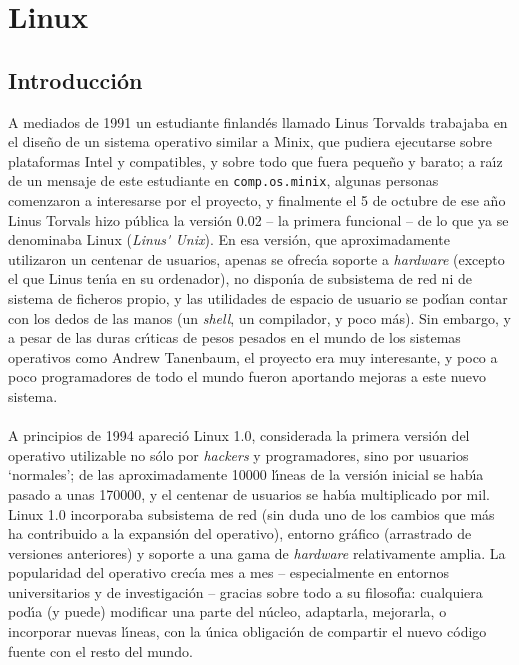 \chapter{Linux}
\section{Introducci\'on}
A mediados de 1991 un estudiante finland\'es llamado Linus Torvalds trabajaba
en el dise\~no de un sistema operativo similar a Minix, que pudiera ejecutarse 
sobre plataformas Intel y compatibles, y sobre todo que fuera peque\~no y 
barato; a ra\'{\i}z de un mensaje de este estudiante en {\tt comp.os.minix}, 
algunas personas comenzaron a interesarse por el proyecto, y finalmente el 5 de 
octubre de ese a\~no Linus Torvals hizo p\'ublica la versi\'on 0.02 -- la 
primera funcional -- de lo que ya se denominaba Linux ({\it Linus\'{} Unix}). En
esa versi\'on, que aproximadamente utilizaron un centenar de usuarios, apenas
se ofrec\'{\i}a soporte a {\it hardware} (excepto el que Linus ten\'{\i}a en
su ordenador), no dispon\'{\i}a de subsistema de red ni de sistema de ficheros
propio, y las utilidades de espacio de usuario se pod\'{\i}an contar con 
los dedos de las manos (un {\it shell}, un compilador, y poco m\'as). Sin 
embargo, y a pesar de las duras cr\'{\i}ticas de pesos pesados en el mundo de 
los sistemas operativos como Andrew Tanenbaum, el proyecto era muy interesante, 
y poco a poco programadores de todo el mundo fueron aportando mejoras a este 
nuevo sistema.\\
\\A principios de 1994 apareci\'o Linux 1.0, considerada la primera versi\'on
del operativo utilizable no s\'olo por {\it hackers} y programadores, sino por
usuarios `normales'; de las aproximadamente 10000 l\'{\i}neas de la versi\'on
inicial se hab\'{\i}a pasado a unas 170000, y el centenar de usuarios se 
hab\'{\i}a multiplicado por mil. Linux 1.0 incorporaba subsistema de red (sin
duda uno de los cambios que m\'as ha contribuido a la expansi\'on del 
operativo), entorno gr\'afico (arrastrado de versiones anteriores) y soporte a
una gama de {\it hardware} relativamente amplia. La popularidad del operativo
crec\'{\i}a mes a mes -- especialmente en entornos universitarios y de 
investigaci\'on -- gracias sobre todo a su filosof\'{\i}a: cualquiera 
pod\'{\i}a (y puede) modificar una parte del n\'ucleo, adaptarla, mejorarla, o
incorporar nuevas l\'{\i}neas, con la \'unica obligaci\'on de compartir el nuevo
c\'odigo fuente con el resto del mundo.\\
